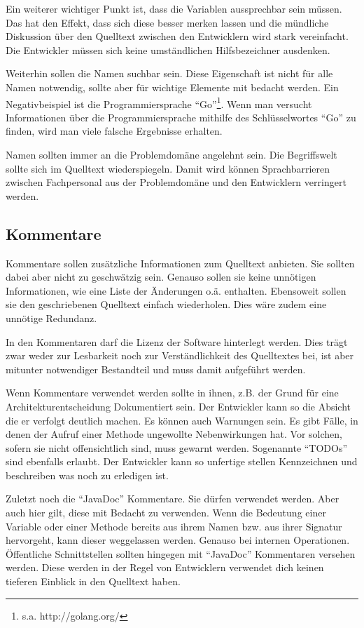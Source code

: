 Ein weiterer wichtiger Punkt ist, dass die Variablen aussprechbar sein müssen. Das hat den Effekt, dass sich diese besser merken lassen und die mündliche Diskussion über den Quelltext zwischen den Entwicklern wird stark vereinfacht. Die Entwickler müssen sich keine umständlichen Hilfsbezeichner ausdenken.

Weiterhin sollen die Namen suchbar sein. Diese Eigenschaft ist nicht für alle Namen notwendig, sollte aber für wichtige Elemente mit bedacht werden. Ein Negativbeispiel ist die Programmiersprache \enquote{Go}\footnote{s.a. http://golang.org/}. Wenn man versucht Informationen über die Programmiersprache mithilfe des Schlüsselwortes \enquote{Go} zu finden, wird man viele falsche Ergebnisse erhalten.

Namen sollten immer an die Problemdomäne angelehnt sein. Die Begriffswelt sollte sich im Quelltext wiederspiegeln. Damit wird können Sprachbarrieren zwischen Fachpersonal aus der Problemdomäne und den Entwicklern verringert werden.

\subsection{Kommentare}
Kommentare sollen zusätzliche Informationen zum Quelltext anbieten. Sie sollten dabei aber nicht zu geschwätzig sein. Genauso sollen sie keine unnötigen Informationen, wie eine Liste der Änderungen o.ä. enthalten. Ebensoweit sollen sie den geschriebenen Quelltext einfach wiederholen. Dies wäre zudem eine unnötige Redundanz.

In den Kommentaren darf die Lizenz der Software hinterlegt werden. Dies trägt zwar weder zur Lesbarkeit noch zur Verständlichkeit des Quelltextes bei, ist aber mitunter notwendiger Bestandteil und muss damit aufgeführt werden.

Wenn Kommentare verwendet werden sollte in ihnen, z.B. der Grund für eine Architekturentscheidung Dokumentiert sein. Der Entwickler kann so die Absicht die er verfolgt deutlich machen. Es können auch Warnungen sein. Es gibt Fälle, in denen der Aufruf einer Methode ungewollte Nebenwirkungen hat. Vor solchen, sofern sie nicht offensichtlich sind, muss gewarnt werden. Sogenannte \enquote{TODOs} sind ebenfalls erlaubt. Der Entwickler kann so unfertige stellen Kennzeichnen und beschreiben was noch zu erledigen ist.

Zuletzt noch die \enquote{JavaDoc} Kommentare. Sie dürfen verwendet werden. Aber auch hier gilt, diese mit Bedacht zu verwenden. Wenn die Bedeutung einer Variable oder einer Methode bereits aus ihrem Namen bzw. aus ihrer Signatur hervorgeht, kann dieser weggelassen werden. Genauso bei internen Operationen. Öffentliche Schnittstellen sollten hingegen mit \enquote{JavaDoc} Kommentaren versehen werden. Diese werden in der Regel von Entwicklern verwendet dich keinen tieferen Einblick in den Quelltext haben.


